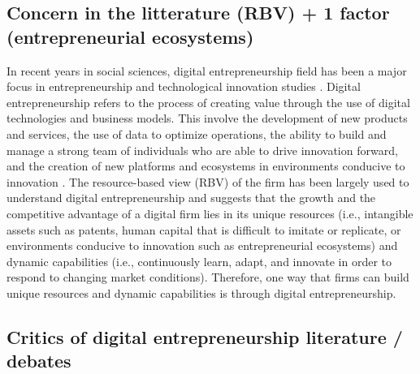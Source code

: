 \documentclass[12pt]{article}
\begin{document}
\subsection{Concern in the litterature (RBV) + 1 factor (entrepreneurial ecosystems)}

In recent years in social sciences, digital entrepreneurship field has been a major focus in entrepreneurship and  technological innovation studies \citep{zaheer2019digital, giones2017digital, nambisan2019digital, sahut2021age}. Digital entrepreneurship refers to the process of creating value through the use of digital technologies and business models. This involve the development of new products and services, the use of data to optimize operations, the ability to build and manage a strong team of individuals who are able to drive innovation forward, and the creation of new platforms and ecosystems in environments conducive to innovation \citep{spigel2017relational}. The resource-based view (RBV) of the firm has been largely used to understand digital entrepreneurship and suggests that the growth and the competitive advantage of a digital firm lies in its unique resources (i.e., intangible assets such as patents, human capital that is difficult to imitate or replicate, or environments conducive to innovation such as entrepreneurial ecosystems) and dynamic capabilities (i.e., continuously learn, adapt, and innovate in order to respond to changing market conditions). Therefore, one way that firms can build unique resources and dynamic capabilities is through digital entrepreneurship.

\subsection{Critics of digital entrepreneurship literature / debates}
\end{document}
